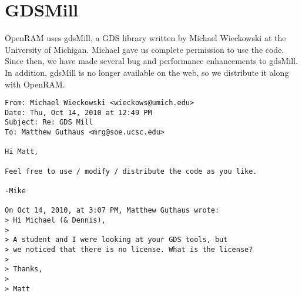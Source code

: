 \section*{GDSMill}
\label{sec:gdsMill_permission}

OpenRAM uses gdsMill, a GDS library written by Michael Wieckowski at
the University of Michigan. Michael gave us complete permission to use
the code. Since then, we have made several bug and performance
enhancements to gdsMill. In addition, gdsMill is no longer available
on the web, so we distribute it along with OpenRAM.


\begin{verbatim}
From: Michael Wieckowski <wieckows@umich.edu>
Date: Thu, Oct 14, 2010 at 12:49 PM
Subject: Re: GDS Mill
To: Matthew Guthaus <mrg@soe.ucsc.edu>

Hi Matt,

Feel free to use / modify / distribute the code as you like.

-Mike

On Oct 14, 2010, at 3:07 PM, Matthew Guthaus wrote:
> Hi Michael (& Dennis),
>
> A student and I were looking at your GDS tools, but 
> we noticed that there is no license. What is the license?
>
> Thanks,
>
> Matt

\end{verbatim}
